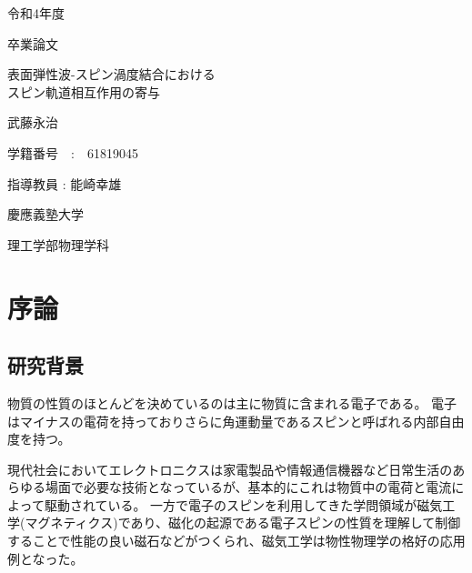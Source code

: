 \documentclass[dvipdfmx]{jsreport}
\numberwithin{equation}{chapter}
\numberwithin{table}{chapter}
\begin{document}
\begin{titlepage}
	\begin{center}
		
		{\large 令和4年度}
		
		\vspace{10truept}
		
		{\large 卒業論文}
		
		\vspace*{100truept}
		
		{\huge 表面弾性波-スピン渦度結合における\\スピン軌道相互作用の寄与} 
		
		\vspace{80truept}
		
		{\LARGE 武藤永治}
		
		\vspace{5truept}
		
		{\Large 学籍番号　:　61819045}
		
		\vspace{70truept}
		
		{\Large 指導教員 : 能崎幸雄}
		
		\vspace{70truept}
		
		{\Large 慶應義塾大学}
		
		\vspace{10truept}
		
		{\Large 理工学部物理学科}
		
    
		
	\end{center}
\end{titlepage}

\setcounter{tocdepth}{3}
\tableofcontents
\clearpage

\chapter{序論}
\section{研究背景}
物質の性質のほとんどを決めているのは主に物質に含まれる電子である。
電子はマイナスの電荷を持っておりさらに角運動量であるスピンと呼ばれる内部自由度を持つ。

現代社会においてエレクトロニクスは家電製品や情報通信機器など日常生活のあらゆる場面で必要な技術となっているが、基本的にこれは物質中の電荷と電流によって駆動されている。
一方で電子のスピンを利用してきた学問領域が磁気工学(マグネティクス)であり、磁化の起源である電子スピンの性質を理解して制御することで性能の良い磁石などがつくられ、磁気工学は物性物理学の格好の応用例となった。
\end{document}
